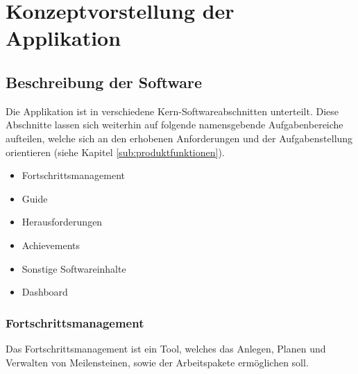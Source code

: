 \documentclass[bibliography=totoc,listof=totoc,BCOR=5mm,DIV=12,oneside]{scrbook}
\begin{document}
\chapter{Konzeptvorstellung der Applikation} \label{chap:konzept}

\section{Beschreibung der Software}
\par Die Applikation ist in verschiedene Kern-Softwareabschnitten unterteilt. Diese Abschnitte lassen sich weiterhin auf folgende namensgebende Aufgabenbereiche aufteilen, welche sich an den erhobenen Anforderungen und der Aufgabenstellung orientieren (siehe Kapitel \ref{sub:produktfunktionen}).

\begin{itemize}
\item Fortschrittsmanagement
\item Guide
\item Herausforderungen
\item Achievements
\item Sonstige Softwareinhalte
\item Dashboard
\end{itemize}

\newpage
\subsection{Fortschrittsmanagement}
\par Das Fortschrittsmanagement ist ein Tool, welches das Anlegen, Planen und Verwalten von Meilensteinen, sowie der Arbeitspakete ermöglichen soll. 
\end{document}
